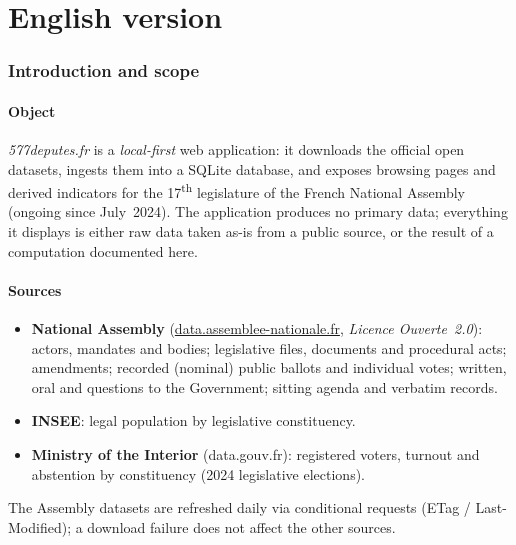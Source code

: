 \clearpage
{}
\part{English version}
\setcounter{section}{0}   %

\section{Introduction and scope}

\subsection{Object}
\emph{577deputes.fr} is a \emph{local-first} web application: it downloads the
official open datasets, ingests them into a SQLite database, and exposes browsing
pages and derived indicators for the 17\textsuperscript{th} legislature of the
French National Assembly (ongoing since July~2024). The application produces no
primary data; everything it displays is either raw data taken as-is from a public
source, or the result of a computation documented here.

\subsection{Sources}
\begin{itemize}
  \item \textbf{National Assembly} (\href{https://data.assemblee-nationale.fr}{data.assemblee-nationale.fr},
        \emph{Licence Ouverte~2.0}): actors, mandates and bodies; legislative files,
        documents and procedural acts; amendments; recorded (nominal) public
        ballots and individual votes; written, oral and questions to the
        Government; sitting agenda and verbatim records.
  \item \textbf{INSEE}: legal population by legislative constituency.
  \item \textbf{Ministry of the Interior} (data.gouv.fr): registered voters,
        turnout and abstention by constituency (2024 legislative elections).
\end{itemize}
The Assembly datasets are refreshed daily via conditional requests
(ETag / Last-Modified); a download failure does not affect the other sources.

